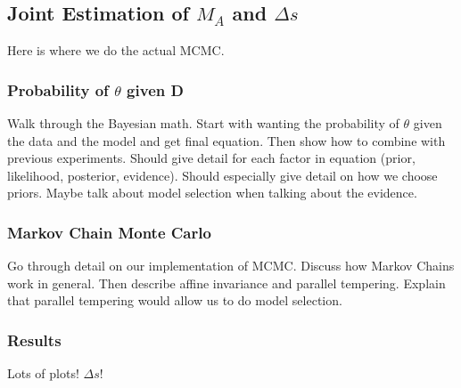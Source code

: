 \subsection{Joint Estimation of $M_A$ and $\Delta s$}\label{deltas}
  Here is where we do the actual MCMC.
  \subsubsection{Probability of $\theta$ given D}
    Walk through the Bayesian math. Start with wanting the probability of
    $\theta$ given the data and the model and get final equation. Then show how
    to combine with previous experiments. Should give detail for each factor in
    equation (prior, likelihood, posterior, evidence). Should especially give
    detail on how we choose priors. Maybe talk about model selection when
    talking about the evidence.
  \subsubsection{Markov Chain Monte Carlo}
    Go through detail on our implementation of MCMC. Discuss how Markov Chains
    work in general. Then describe affine invariance and parallel tempering.
    Explain that parallel tempering would allow us to do model selection.
  \subsubsection{Results}
    Lots of plots! $\Delta s$!


